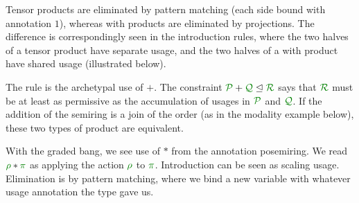 \documentclass[a4paper]{easychair}
\begin{document}
\vspace{-0.3cm}


Tensor products are eliminated by pattern matching (each side bound with
annotation $1$), whereas with products are eliminated by projections.
The difference is correspondingly seen in the introduction rules, where the two
halves of a tensor product have separate usage, and the two halves of a with
product have shared usage (illustrated below).

The rule  is the archetypal use of $+$.
The constraint $\subrctx{\resctx P + \resctx Q}{\resctx R}$ says that $\resctx
R$ must be at least as permissive as the accumulation of usages in $\resctx P$
and $\resctx Q$.
If the addition of the semiring is a join of the order (as in the modality
example below), these two types of product are equivalent.

\vspace{-0.3cm}


With the graded bang, we see use of $*$ from the annotation posemiring.
We read $\rescomment \rho * \rescomment \pi$ as applying the action $\rescomment
\rho$ to $\rescomment \pi$.
Introduction can be seen as scaling usage.
Elimination is by pattern matching, where we bind a new variable with whatever
usage annotation the type gave us.
\end{document}
